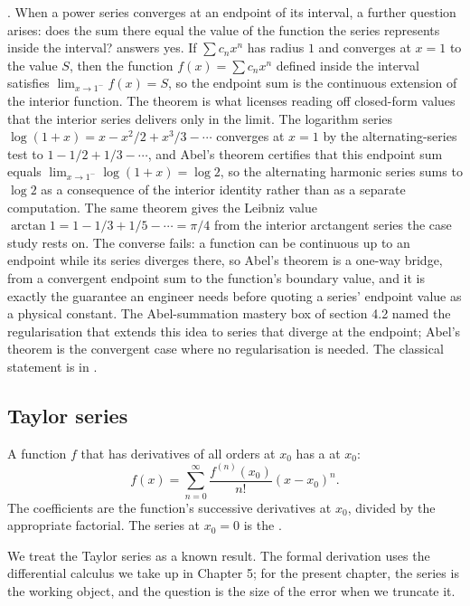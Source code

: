 \begin{mastery}
. When a
power series converges at an endpoint of its interval, a further question
arises: does the sum there equal the value of the function the series
represents inside the interval?  answers yes.
If $\sum c_{n} x^{n}$ has radius $1$ and converges at $x = 1$ to the value
$S$, then the function $f(x) = \sum c_{n} x^{n}$ defined inside the
interval satisfies $\lim_{x \to 1^{-}} f(x) = S$, so the endpoint sum is
the continuous extension of the interior function. The theorem is what
licenses reading off closed-form values that the interior series delivers
only in the limit. The logarithm series $\log(1 + x) = x - x^{2}/2 +
x^{3}/3 - \cdots$ converges at $x = 1$ by the alternating-series test to
$1 - 1/2 + 1/3 - \cdots$, and Abel's theorem certifies that this endpoint
sum equals $\lim_{x \to 1^{-}}\log(1 + x) = \log 2$, so the alternating
harmonic series sums to $\log 2$ as a consequence of the interior
identity rather than as a separate computation. The same theorem gives
the Leibniz value $\arctan 1 = 1 - 1/3 + 1/5 - \cdots = \pi/4$ from the
interior arctangent series the case study rests on. The converse fails:
a function can be continuous up to an endpoint while its series diverges
there, so Abel's theorem is a one-way bridge, from a convergent endpoint
sum to the function's boundary value, and it is exactly the guarantee an
engineer needs before quoting a series' endpoint value as a physical
constant. The Abel-summation mastery box of section 4.2 named the
regularisation that extends this idea to series that diverge at the
endpoint; Abel's theorem is the convergent case where no regularisation
is needed. The classical statement is in
\cite{text:v2ch06-hairer-wanner-analysis}.
\end{mastery}

\subsection{Taylor series}

A function $f$ that has derivatives of all orders at $x_{0}$ has a
 at $x_{0}$:
\[
f(x) = \sum_{n=0}^{\infty} \frac{f^{(n)}(x_{0})}{n!} (x - x_{0})^{n}.
\]
The coefficients are the function's successive derivatives at $x_{0}$,
divided by the appropriate factorial. The series at $x_{0} = 0$ is the
.

We treat the Taylor series as a known result. The formal derivation
uses the differential calculus we take up in Chapter 5; for the present
chapter, the series is the working object, and the question is the
size of the error when we truncate it.

